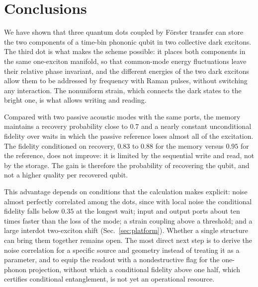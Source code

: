 \documentclass[aps,pra,preprint,groupedaddress,amsmath,amssymb,floatfix]{revtex4-2}
\begin{document}
\section{Conclusions}
\label{sec:conclusions}
We have shown that three quantum dots coupled by F\"orster transfer can store the two components of a time-bin phononic qubit in two collective dark excitons. The third dot is what makes the scheme possible: it places both components in the same one-exciton manifold, so that common-mode energy fluctuations leave their relative phase invariant, and the different energies of the two dark excitons allow them to be addressed by frequency with Raman pulses, without switching any interaction. The nonuniform strain, which connects the dark states to the bright one, is what allows writing and reading.

Compared with two passive acoustic modes with the same ports, the memory maintains a recovery probability close to $0.7$ and a nearly constant unconditional fidelity over waits in which the passive reference loses almost all of the excitation. The fidelity conditioned on recovery, $0.83$ to $0.88$ for the memory versus $0.95$ for the reference, does not improve: it is limited by the sequential write and read, not by the storage. The gain is therefore the probability of recovering the qubit, and not a higher quality per recovered qubit.

This advantage depends on conditions that the calculation makes explicit: noise almost perfectly correlated among the dots, since with local noise the conditional fidelity falls below $0.35$ at the longest wait; input and output ports about ten times faster than the loss of the mode; a strain coupling above a threshold; and a large interdot two-exciton shift (Sec.~\ref{sec:platform}). Whether a single structure can bring them together remains open. The most direct next step is to derive the noise correlation for a specific source and geometry instead of treating it as a parameter, and to equip the readout with a nondestructive flag for the one-phonon projection, without which a conditional fidelity above one half, which certifies conditional entanglement, is not yet an operational resource.

\end{document}
